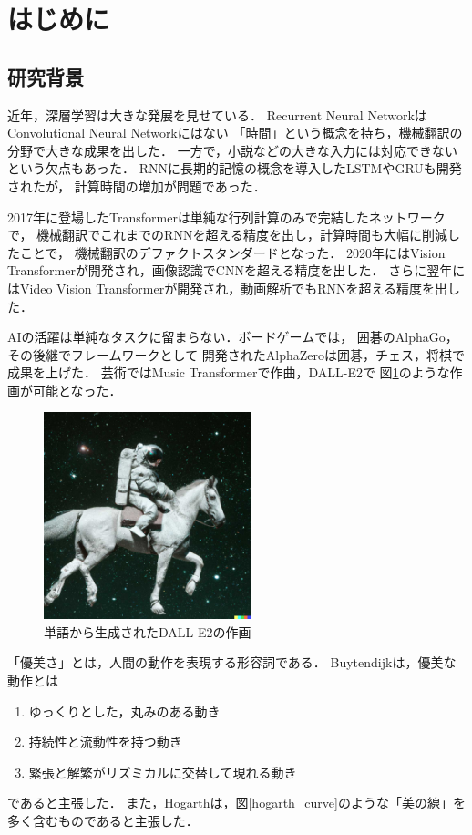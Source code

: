 \section{はじめに}

\subsection{研究背景}
近年，深層学習は大きな発展を見せている．
Recurrent Neural Network\cite{rnn}はConvolutional Neural Network\cite{cnn}にはない
「時間」という概念を持ち，機械翻訳の分野で大きな成果を出した．
一方で，小説などの大きな入力には対応できないという欠点もあった．
RNNに長期的記憶の概念を導入したLSTM\cite{lstm}やGRU\cite{gru}も開発されたが，
計算時間の増加が問題であった．

2017年に登場したTransformer\cite{transformer}は単純な行列計算のみで完結したネットワークで，
機械翻訳でこれまでのRNNを超える精度を出し，計算時間も大幅に削減したことで，
機械翻訳のデファクトスタンダードとなった．
2020年にはVision Transformer\cite{vit}が開発され，画像認識でCNNを超える精度を出した．
さらに翌年にはVideo Vision Transformer\cite{vivit}が開発され，動画解析でもRNNを超える精度を出した．

AIの活躍は単純なタスクに留まらない．ボードゲームでは，
囲碁のAlphaGo\cite{alphago}，その後継でフレームワークとして
開発されたAlphaZero\cite{alphazero}は囲碁，チェス，将棋で成果を上げた．
芸術ではMusic Transformer\cite{mut}で作曲，DALL-E2\cite{dalle2}で
図\ref{astronaut}のような作画が可能となった．

\begin{figure}[b]
  \begin{center}
    \includegraphics[width=60mm]{images/astronaut.jpg}
  \end{center}
  \caption{単語から生成されたDALL-E2の作画}
  \label{astronaut}
\end{figure}
\clearpage

「優美さ」とは，人間の動作を表現する形容詞である．
Buytendijkは，優美な動作とは
\begin{enumerate}
  \item ゆっくりとした，丸みのある動き
  \item 持続性と流動性を持つ動き
  \item 緊張と解繁がリズミカルに交替して現れる動き
\end{enumerate}
であると主張した．
また，Hogarthは，図\ref{hogarth_curve}のような「美の線」を多く含むものであると主張した．

